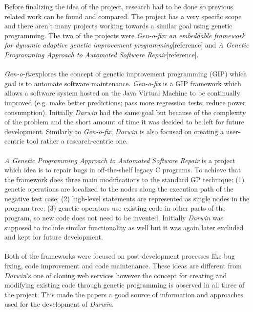 Before finalizing the idea of the project, research had to be done so previous related work can be found and compared. The project has a very
specific scope and there aren't many projects working towards a similar goal using genetic programming. The two of the projects were
\textit{Gen-o-fix: an embeddable framework for dynamic adaptive genetic improvement programming}[reference] and \textit{A Genetic Programming Approach to
Automated Software Repair}[reference].
\paragraph{}
\textit{Gen-o-fix}explores the concept of  genetic improvement programming (GIP) which goal is to automate software
maintenance. \textit{Gen-o-fix} is a GIP framework which allows a software system hosted on the Java Virtual Machine to be continually improved
(e.g. make better predictions; pass more regression tests; reduce power consumption). Initially \textit{Darwin} had the same goal but because of 
the complexity of the problem and the short amount of time it was decided to be left for future development. Similarly to \textit{Gen-o-fix},
\textit{Darwin} is also focused on creating a user-centric tool rather a research-centric one.
\paragraph{}
\textit{A Genetic Programming Approach to Automated Software Repair} is a project which idea is to repair bugs in off-the-shelf legacy C programs.
To achieve that the framework does three main modifications to the standard GP technique: (1) genetic operations are localized to the nodes along the execution path
of the negative test case; (2) high-level statements are represented as single nodes in the program tree; (3) genetic operators use existing
code in other parts of the program, so new code does not need to be invented. Initially \textit{Darwin} was supposed to include similar functionality
as well but it was again later excluded and kept for future development.
\paragraph{}
Both of the frameworks were focused on post-development processes like bug fixing, code improvement and code maintenance. These ideas are different
from \textit{Darwin}'s one of cloning web services however the concept for creating and modifying existing code through genetic programming is observed
in all three of the project. This made the papers a good source of information and approaches used for the development of \textit{Darwin}.